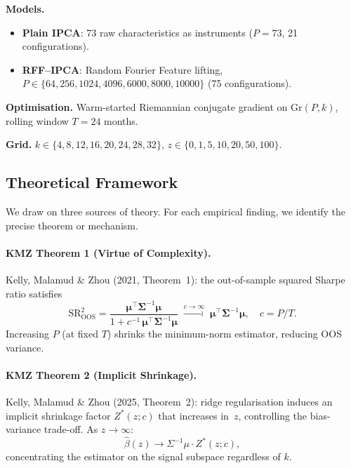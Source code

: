 \documentclass[11pt,a4paper]{article}
\begin{document}
\noindent\textbf{Models.}
\begin{itemize}[nosep]
  \item \textbf{Plain IPCA}: 73 raw characteristics as instruments ($P = 73$, 21 configurations).
  \item \textbf{RFF--IPCA}: Random Fourier Feature lifting, $P \in \{64, 256, 1024, 4096, 6000, 8000, 10000\}$ (75 configurations).
\end{itemize}

\noindent\textbf{Optimisation.}  Warm-started Riemannian conjugate gradient on $\mathrm{Gr}(P, k)$, rolling window $T = 24$ months.

\noindent\textbf{Grid.}  $k \in \{4, 8, 12, 16, 20, 24, 28, 32\}$, \quad $z \in \{0, 1, 5, 10, 20, 50, 100\}$.

\subsection{Theoretical Framework}

We draw on three sources of theory.  For each empirical finding, we identify the precise theorem or mechanism.

\paragraph{KMZ Theorem 1 (Virtue of Complexity).}
Kelly, Malamud \& Zhou (2021, Theorem~1): the out-of-sample squared Sharpe ratio satisfies
\begin{equation}
  \mathrm{SR}^2_{\mathrm{OOS}}
  = \frac{\boldsymbol{\mu}^\top \boldsymbol{\Sigma}^{-1} \boldsymbol{\mu}}
         {1 + c^{-1}\,\boldsymbol{\mu}^\top \boldsymbol{\Sigma}^{-1} \boldsymbol{\mu}}
  \;\xrightarrow{c \to \infty}\;
  \boldsymbol{\mu}^\top \boldsymbol{\Sigma}^{-1} \boldsymbol{\mu},
  \quad c = P / T.
  \label{eq:kmz1}
\end{equation}
Increasing $P$ (at fixed $T$) shrinks the minimum-norm estimator, reducing OOS variance.

\paragraph{KMZ Theorem 2 (Implicit Shrinkage).}
Kelly, Malamud \& Zhou (2025, Theorem~2): ridge regularisation induces an implicit shrinkage factor $Z^*(z; c)$ that increases in~$z$, controlling the bias-variance trade-off.  As $z \to \infty$:
\begin{equation}
  \hat\beta(z) \to \Sigma^{-1}\mu \cdot Z^*(z; c),
  \label{eq:kmz2}
\end{equation}
concentrating the estimator on the signal subspace regardless of $k$.
\end{document}
